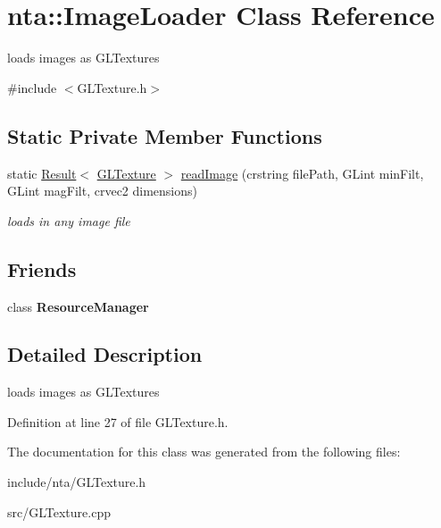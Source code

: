 \hypertarget{classnta_1_1ImageLoader}{}\section{nta\+:\+:Image\+Loader Class Reference}
\label{classnta_1_1ImageLoader}


loads images as G\+L\+Textures  




{\ttfamily \#include $<$G\+L\+Texture.\+h$>$}

\subsection*{Static Private Member Functions}
\begin{DoxyCompactItemize}
\item 
\mbox{\label{classnta_1_1ImageLoader_ae4902a82fc36dd4ec8d78a1aa610d0cc}} 
static \hyperlink{classnta_1_1Result}{Result}$<$ \hyperlink{structnta_1_1GLTexture}{G\+L\+Texture} $>$ \hyperlink{classnta_1_1ImageLoader_ae4902a82fc36dd4ec8d78a1aa610d0cc}{read\+Image} (crstring file\+Path, G\+Lint min\+Filt, G\+Lint mag\+Filt, crvec2 dimensions)
\begin{DoxyCompactList}\small\item\em loads in any image file \end{DoxyCompactList}\end{DoxyCompactItemize}
\subsection*{Friends}
\begin{DoxyCompactItemize}
\item 
\mbox{\label{classnta_1_1ImageLoader_a54c1252abc87a78a301e6b6984470408}} 
class {\bfseries Resource\+Manager}
\end{DoxyCompactItemize}


\subsection{Detailed Description}
loads images as G\+L\+Textures 

Definition at line 27 of file G\+L\+Texture.\+h.



The documentation for this class was generated from the following files\+:\begin{DoxyCompactItemize}
\item 
include/nta/G\+L\+Texture.\+h\item 
src/G\+L\+Texture.\+cpp\end{DoxyCompactItemize}
